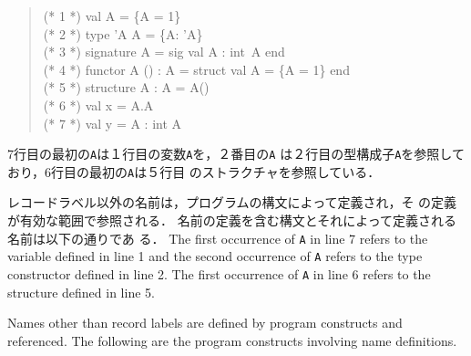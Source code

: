 \documentclass{jbook}
\newcommand{\code}[1]{\mbox{\large\tt #1}}
\newenvironment{program}{\begin{quote}\begin{tt}}%
                        {\end{tt}\end{quote}}
\begin{document}
\begin{program}
(* 1 *) val A = \{A = 1\}\\
(* 2 *) type 'A A =  \{A: 'A\}\\
(* 3 *) signature A = sig val A : int\ A end\\
(* 4 *) functor A () : A = struct val A = \{A = 1\} end\\
(* 5 *) structure A : A = A()\\
(* 6 *) val x = A.A\\
(* 7 *) val y = A : int A
\end{program}
\ifjp%
	7行目の最初の\code{A}は１行目の変数\code{A}を，２番目の\code{A}
は２行目の型構成子\code{A}を参照しており，6行目の最初の\code{A}は５行目
のストラクチャを参照している．

	レコードラベル以外の名前は，プログラムの構文によって定義され，そ
の定義が有効な範囲で参照される．
	名前の定義を含む構文とそれによって定義される名前は以下の通りであ
る．
\else%
	The first occurrence of \code{A} in line 7 refers to the variable defined in line 1
and the second occurrence of \code{A} refers to the type constructor
defined in line 2.
	The first occurrence of \code{A} in line 6 refers to the
structure defined in line 5.

	Names other than record labels are defined by program constructs
and referenced.
	The following are the program constructs involving name definitions.
\fi%
\end{document}
